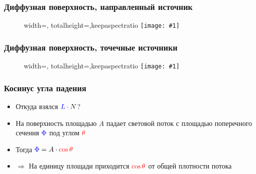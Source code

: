 \documentclass[10pt]{beamer}
\newcommand{\slideimage}[1]{
  \begin{figure}
    \begin{adjustbox}{width=\textwidth, totalheight=\textheight-2\baselineskip-2\baselineskip,keepaspectratio}
      \texttt{[image: \#1]}
    \end{adjustbox}
  \end{figure}
}
\begin{document}
\begin{frame}[fragile]
\frametitle{Диффузная поверхность, направленный источник}
\slideimage{diffuse.png}
\end{frame}

\begin{frame}[fragile]
\frametitle{Диффузная поверхность, точечные источники}
\slideimage{point_lights.png}
\end{frame}


\begin{frame}[fragile]
\frametitle{Косинус угла падения}
\begin{itemize}
\item Откуда взялся \begin{math}{\color{blue}L} \cdot N\end{math}?
\pause
\item На поверхность площадью \begin{math}A\end{math} падает световой поток с площадью поперечного сечения \begin{math}{\color{blue} \Phi}\end{math} под углом \begin{math}\color{red}\theta\end{math}
\item Тогда \begin{math}{\color{blue} \Phi} = A \cdot {\color{red} \cos \theta}\end{math}
\item \begin{math}\Longrightarrow\end{math} На единицу площади приходится \begin{math}{\color{red}\cos \theta}\end{math} от общей плотности потока
\end{itemize}
\begin{center}
\end{center}
\end{frame}
\end{document}
